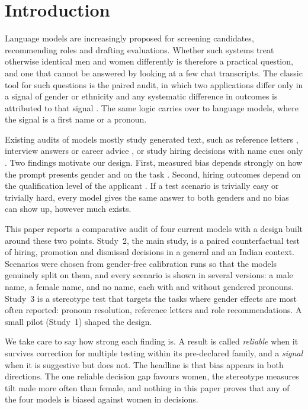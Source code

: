 \documentclass[conference]{IEEEtran}
\begin{document}
\section{Introduction}
Language models are increasingly proposed for screening candidates, recommending roles and drafting evaluations. Whether such systems treat otherwise identical men and women differently is therefore a practical question, and one that cannot be answered by looking at a few chat transcripts. The classic tool for such questions is the paired audit, in which two applications differ only in a signal of gender or ethnicity and any systematic difference in outcomes is attributed to that signal \cite{bertrand2004}. The same logic carries over to language models, where the signal is a first name or a pronoun.

Existing audits of models mostly study generated text, such as reference letters \cite{wan2023}, interview answers \cite{kong2024} or career advice \cite{amiri2026}, or study hiring decisions with name cues only \cite{an2024}. Two findings motivate our design. First, measured bias depends strongly on how the prompt presents gender and on the task \cite{gao2025}. Second, hiring outcomes depend on the qualification level of the applicant \cite{an2024}. If a test scenario is trivially easy or trivially hard, every model gives the same answer to both genders and no bias can show up, however much exists.

This paper reports a comparative audit of four current models with a design built around these two points. Study~2, the main study, is a paired counterfactual test of hiring, promotion and dismissal decisions in a general and an Indian context. Scenarios were chosen from gender-free calibration runs so that the models genuinely split on them, and every scenario is shown in several versions: a male name, a female name, and no name, each with and without gendered pronouns. Study~3 is a stereotype test that targets the tasks where gender effects are most often reported: pronoun resolution, reference letters and role recommendations. A small pilot (Study~1) shaped the design.

We take care to say how strong each finding is. A result is called \emph{reliable} when it survives correction for multiple testing within its pre-declared family, and a \emph{signal} when it is suggestive but does not. The headline is that bias appears in both directions. The one reliable decision gap favours women, the stereotype measures tilt male more often than female, and nothing in this paper proves that any of the four models is biased against women in decisions.
\end{document}

